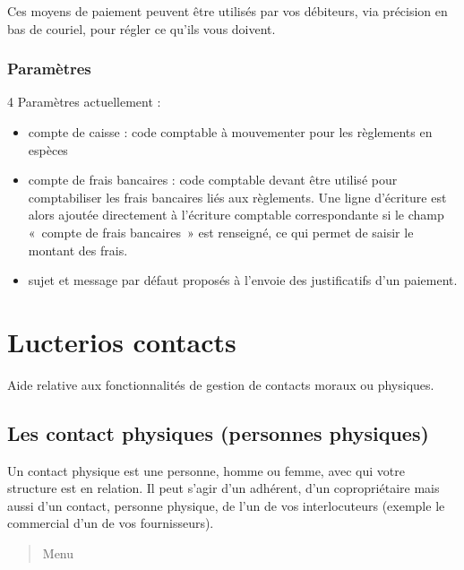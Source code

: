 \documentclass[a4paper,10pt,oneside,french]{sphinxmanual}
\begin{document}
Ces moyens de paiement peuvent être utilisés par vos débiteurs, via précision en bas de couriel, pour régler ce qu’ils vous doivent.


\subsection{Paramètres}
\label{\detokenize{payoff/config:parametres}}
4 Paramètres actuellement :
\begin{itemize}
\item {} 
compte de caisse : code comptable à mouvementer pour les règlements en espèces

\item {} 
compte de frais bancaires : code comptable devant être utilisé pour comptabiliser les frais bancaires liés aux règlements. Une ligne d’écriture est alors ajoutée directement à l’écriture comptable correspondante si le champ « compte de frais bancaires » est renseigné, ce qui permet de saisir le montant des frais.

\item {} 
sujet et message par défaut proposés à l’envoie des justificatifs d’un paiement.

\end{itemize}


\chapter{Lucterios contacts}
\label{\detokenize{contacts/index:lucterios-contacts}}\label{\detokenize{contacts/index::doc}}
Aide relative aux fonctionnalités de gestion de contacts moraux ou physiques.


\section{Les contact physiques (personnes physiques)}
\label{\detokenize{contacts/individual:les-contact-physiques-personnes-physiques}}\label{\detokenize{contacts/individual::doc}}
Un contact physique est une personne, homme ou femme, avec qui votre structure est en relation. Il peut s’agir d’un adhérent, d’un copropriétaire mais aussi d’un contact, personne physique, de l’un de vos interlocuteurs (exemple le commercial d’un de vos fournisseurs).
\begin{quote}

Menu 
\end{quote}
\end{document}
